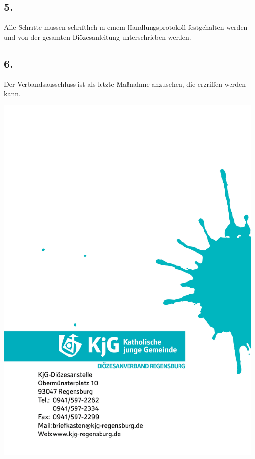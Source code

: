 \documentclass[12pt]{report}
\begin{document}
\begin{justify}
\subsection*{5.}
Alle Schritte müssen schriftlich in einem Handlungsprotokoll festgehalten werden und von der gesamten
Diözesanleitung unterschrieben werden.
\subsection*{6.}
Der Verbandsausschluss ist als letzte Maßnahme anzusehen, die ergriffen werden kann.

\newpage
\pagestyle{empty}
\includegraphics[width=\paperwidth, height=\paperheight]{kjgsatzungende.png}
\restoregeometry
\end{justify}
\end{document}
